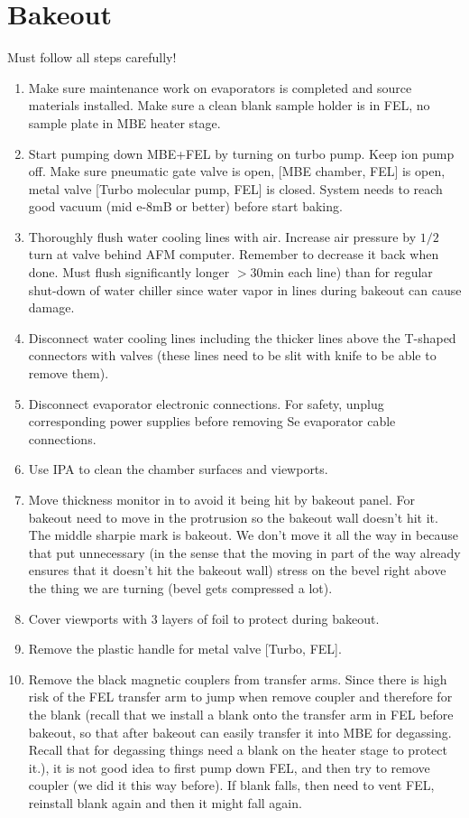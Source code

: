 \section{Bakeout}
Must follow all steps carefully!
\begin{enumerate}
\item Make sure maintenance work on evaporators is completed and source materials installed. Make sure a clean blank sample holder is in FEL, no sample plate in MBE heater stage.
\item	Start pumping down MBE+FEL by turning on turbo pump. Keep ion pump off. Make sure pneumatic gate valve is open, [MBE chamber, FEL] is open, metal valve [Turbo molecular pump, FEL] is closed. System needs to reach good vacuum (mid e-8mB or better) before start baking. 
\item	Thoroughly flush water cooling lines with air. Increase air pressure by $1/2$ turn at valve behind AFM computer. Remember to decrease it back when done. Must flush significantly longer $>30$min each line) than for regular shut-down of water chiller since water vapor in lines during bakeout can cause damage.
\item	Disconnect water cooling lines including the thicker lines above the T-shaped connectors with valves (these lines need to be slit with knife to be able to remove them). 
\item	Disconnect evaporator electronic connections. For safety, unplug corresponding power supplies before removing Se evaporator cable connections. 
\item	Use IPA to clean the chamber surfaces and viewports.
\item	Move thickness monitor in to avoid it being hit by bakeout panel. For bakeout need to move in the protrusion so the bakeout wall doesn’t hit it. The middle sharpie mark is bakeout. We don’t move it all the way in because that put unnecessary (in the sense that the moving in part of the way already ensures that it doesn’t hit the bakeout wall) stress on the bevel right above the thing we are turning (bevel gets compressed a lot).
\item	Cover viewports with 3 layers of foil to protect during bakeout.
\item	Remove the plastic handle for metal valve [Turbo, FEL].
\item   Remove the black magnetic couplers from transfer arms. Since there is high risk of the FEL transfer arm to jump when remove coupler and therefore for the blank (recall that we install a blank onto the transfer arm in FEL before bakeout, so that after bakeout can easily transfer it into MBE for degassing. Recall that for degassing things need a blank on the heater stage to protect it.), it is not good idea to first pump down FEL, and then try to remove coupler (we did it this way before). If blank falls, then need to vent FEL, reinstall blank again and then it might fall again.\\

\end{enumerate}

